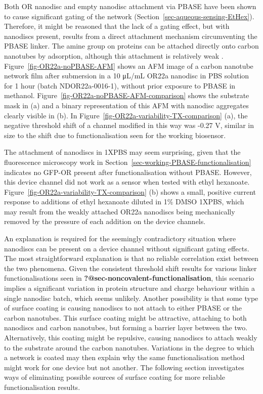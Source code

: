 \documentclass[
  a4paper,
]{scrbook}
\begin{document}
Both OR nanodisc and empty nanodisc attachment via PBASE have been shown
to cause significant gating of the network
(Section~\ref{sec-aqueous-sensing-EtHex}). Therefore, it might be
reasoned that the lack of a gating effect, but with nanodiscs present,
results from a direct attachment mechanism circumventing the PBASE
linker. The amine group on proteins can be attached directly onto carbon
nanotubes by adsorption, although this attachment is relatively weak
\autocite{Bradley2004}. Figure~\ref{fig-OR22a-noPBASE-AFM} shows an AFM
image of a carbon nanotube network film after submersion in a 10 μL/mL
OR22a nanodisc in PBS solution for 1 hour (batch NDOR22a-0016-1),
without prior exposure to PBASE in methanol.
Figure~\ref{fig-OR22a-noPBASE-AFM-comparison} shows the substrate mask
in (a) and a binary representation of this AFM with nanodisc aggregates
clearly visible in (b). In
Figure~\ref{fig-OR22a-variability-TX-comparison} (a), the negative
threshold shift of a channel modified in this way was -0.27 V, similar
in size to the shift due to functionalisation seen for the working
biosensor.

The attachment of nanodiscs in 1XPBS may seem surprising, given that the
fluorescence microscopy work in
Section~\ref{sec-working-PBASE-functionalisation} indicates no GFP-OR
present after functionalisation without PBASE. However, this device
channel did not work as a sensor when tested with ethyl hexanoate.
Figure~\ref{fig-OR22a-variability-TX-comparison} (b) shows a small,
positive current response to additions of ethyl hexanoate diluted in 1\%
DMSO 1XPBS, which may result from the weakly attached OR22a nanodiscs
being mechanically removed by the pressure of each addition on the
device channels.

An explanation is required for the seemingly contradictory situation
where nanodiscs can be present on a device channel without significant
gating effects. The most straightforward explanation is that no reliable
correlation exist between the two phenomena. Given the consistent
threshold shift results for various linker functionalisations seen in
\textbf{?@sec-noncovalent-functionalisation}, this scenario implies a
significant variation in protein structure and charge behaviour within a
single nanodisc batch, which seems unlikely. Another possibility is that
some type of surface coating is causing nanodiscs to not attach to
either PBASE or the carbon nanotubes. This surface coating might be
attractive, attaching to both nanodiscs and carbon nanotubes, but
forming a barrier layer between the two. Alternatively, this coating
might be repulsive, causing nanodiscs to attach weakly to the substrate
around the carbon nanotubes. Variations in the degree to which a network
is coated may then explain why the same functionalisation method might
work for one device but not another. The following section investigates
ways of eliminating possible sources of surface coating for more
reliable functionalisation results.
\end{document}
